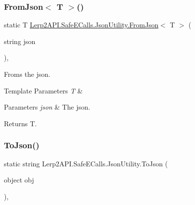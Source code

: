 \subsubsection{\texorpdfstring{From\+Json$<$ T $>$()}{FromJson< T >()}}
{\footnotesize\ttfamily static T \hyperlink{class_lerp2_a_p_i_1_1_safe_e_calls_1_1_json_utility_a9e43c6d45f22ef6046f596254ed1579c}{Lerp2\+A\+P\+I.\+Safe\+E\+Calls.\+Json\+Utility.\+From\+Json}$<$ T $>$ (\begin{DoxyParamCaption}\item[{string}]{json }\end{DoxyParamCaption})\hspace{0.3cm}{\ttfamily [inline]}, {\ttfamily [static]}}



Froms the json. 


\begin{DoxyTemplParams}{Template Parameters}
{\em T} & \\
\hline
\end{DoxyTemplParams}

\begin{DoxyParams}{Parameters}
{\em json} & The json.\\
\hline
\end{DoxyParams}
\begin{DoxyReturn}{Returns}
T.
\end{DoxyReturn}
\mbox{\label{class_lerp2_a_p_i_1_1_safe_e_calls_1_1_json_utility_a9848d9ae46be99c56ced6660bdb8e866}} 
\subsubsection{\texorpdfstring{To\+Json()}{ToJson()}\hspace{0.1cm}{\footnotesize\ttfamily [1/2]}}
{\footnotesize\ttfamily static string Lerp2\+A\+P\+I.\+Safe\+E\+Calls.\+Json\+Utility.\+To\+Json (\begin{DoxyParamCaption}\item[{object}]{obj }\end{DoxyParamCaption})\hspace{0.3cm}{\ttfamily [inline]}, {\ttfamily [static]}}



